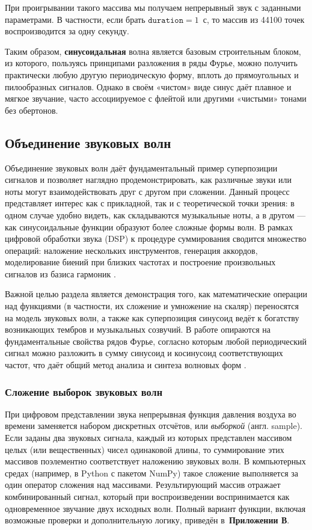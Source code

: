 \documentclass[bachelor, och, diploma]{SCWorks}
\begin{document}
При проигрывании такого массива мы получаем непрерывный звук с заданными параметрами. В частности, если брать \(\texttt{duration}=1\)~с, то массив из 44100 точек воспроизводится за одну секунду.

Таким образом, \textbf{синусоидальная} волна является базовым строительным блоком, из которого, пользуясь принципами разложения в ряды Фурье, можно получить практически любую другую периодическую форму, вплоть до прямоугольных и пилообразных сигналов. Однако в своём «чистом» виде синус даёт плавное и мягкое звучание, часто ассоциируемое с флейтой или другими «чистыми» тонами без обертонов.

\subsection{Объединение звуковых волн}

Объединение звуковых волн даёт фундаментальный пример суперпозиции сигналов и позволяет наглядно продемонстрировать, как различные звуки или ноты могут взаимодействовать друг с другом при сложении. Данный процесс представляет интерес как с прикладной, так и с теоретической точки зрения: в одном случае удобно видеть, как складываются музыкальные ноты, а в другом --- как синусоидальные функции образуют более сложные формы волн. В рамках цифровой обработки звука (DSP) к процедуре суммирования сводится множество операций: наложение нескольких инструментов, генерация аккордов, моделирование биений при близких частотах и построение произвольных сигналов из базиса гармоник \cite{tolstov}.

Важной целью раздела является демонстрация того, как математические операции над функциями (в частности, их сложение и умножение на скаляр) переносятся на модель звуковых волн, а также как суперпозиция синусоид ведёт к богатству возникающих тембров и музыкальных созвучий. В работе опираются на фундаментальные свойства рядов Фурье, согласно которым любой периодический сигнал можно разложить в сумму синусоид и косинусоид соответствующих частот, что даёт общий метод анализа и синтеза волновых форм \cite{bracewell}.

\subsubsection{Сложение выборок звуковых волн}
При цифровом представлении звука непрерывная функция давления воздуха во времени заменяется набором дискретных отсчётов, или \emph{выборкой} (англ. sample). Если заданы два звуковых сигнала, каждый из которых представлен массивом целых (или вещественных) чисел одинаковой длины, то суммирование этих массивов поэлементно соответствует наложению звуковых волн. В компьютерных средах (например, в Python с пакетом NumPy) такое сложение выполняется за один оператор сложения над массивами. Результирующий массив отражает комбинированный сигнал, который при воспроизведении воспринимается как одновременное звучание двух исходных волн. Полный вариант функции, включая возможные проверки и дополнительную логику, приведён в~\textbf{Приложении В}.
\end{document}
